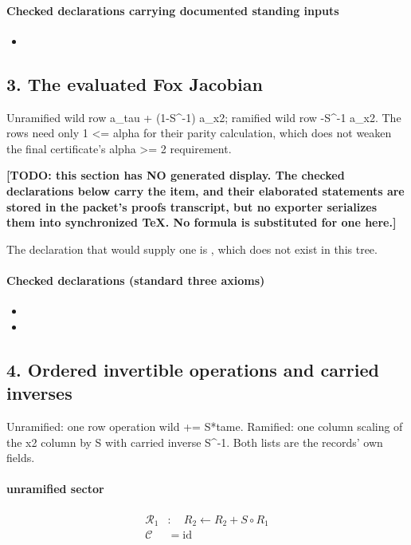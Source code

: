 \paragraph{Checked declarations carrying documented standing inputs}
\begin{itemize}
\item {}
\end{itemize}

\subsection*{3. The evaluated Fox Jacobian}
Unramified wild row a\_tau + (1-S\textasciicircum{}-1) a\_x2; ramified wild row -S\textasciicircum{}-1 a\_x2. The rows need only 1 <= alpha for their parity calculation, which does not weaken the final certificate's alpha >= 2 requirement.

\par\noindent\textbf{[TODO: this section has NO generated display. The checked declarations below carry the item, and their elaborated statements are stored in the packet's proofs transcript, but no exporter serializes them into synchronized TeX. No formula is substituted for one here.]}
\par\noindent The declaration that would supply one is , which does not exist in this tree.
\paragraph{Checked declarations (standard three axioms)}
\begin{itemize}
\item {}
\item {}
\end{itemize}

\subsection*{4. Ordered invertible operations and carried inverses}
Unramified: one row operation wild += S*tame. Ramified: one column scaling of the x2 column by S with carried inverse S\textasciicircum{}-1. Both lists are the records' own fields.

\paragraph{unramified sector}
\[\begin{aligned}\mathcal R_{1}&:\quad R_2\leftarrow R_2+S\circ R_1\\\mathcal C&=\mathrm{id}\end{aligned}\]
